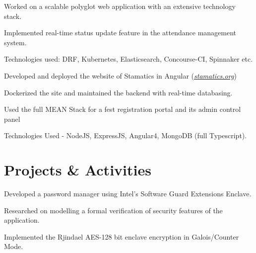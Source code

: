 \documentclass[]{deedy-resume-openfont}
\begin{document}
\begin{minipage}[t]{0.70\textwidth}
\vspace{0.1cm}
\vspace{0cm} %
\begin{tightemize}
  \item Worked on a scalable polyglot web application with an extensive technology stack.
  \item Implemented real-time status update feature in the attendance management system.
  \item Technologies used: DRF, Kubernetes, Elasticsearch, Concourse-CI, Spinnaker etc.
\end{tightemize}

\vspace{0.1cm}
\begin{tightemize}
  \item Developed and deployed the website of Stamatics in Angular (\href{http://stamatics.org}{\textit{stamatics.org}})
  \item Dockerized the site and maintained the backend with real-time databasing.
\end{tightemize}
\begin{tightemize}
  \item Used the full MEAN Stack for a fest registration portal and its admin control panel
  \item Technologies Used - NodeJS, ExpressJS, Angular4, MongoDB (full Typescript).
\end{tightemize}


\section{Projects \& Activities}


\begin{tightemize}
  \item Developed a password manager using Intel's Software Guard Extensions Enclave.
  \item Researched on modelling a formal verification of security features of the application.
  \item Implemented the Rjindael AES-128 bit enclave encryption in Galois/Counter Mode.
\end{tightemize}


\end{minipage}
\end{document}
